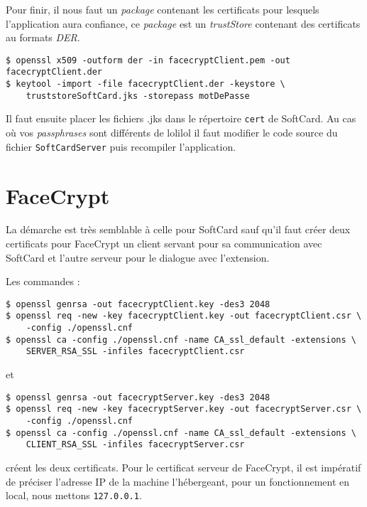 \documentclass[a4paper,10pt]{article}
\begin{document}
Pour finir, il nous faut un \emph{package} contenant les certificats pour 
lesquels l'application aura confiance, ce \emph{package} est un 
\emph{trustStore} contenant des certificats au formats \emph{DER}.
\begin{verbatim}
$ openssl x509 -outform der -in facecryptClient.pem -out facecryptClient.der
$ keytool -import -file facecryptClient.der -keystore \ 
    truststoreSoftCard.jks -storepass motDePasse
\end{verbatim}

Il faut ensuite placer les fichiers .jks dans le répertoire \texttt{cert}
de SoftCard. Au cas où vos \emph{passphrases} sont différents de 
\og lolilol \fg{} il faut modifier le code source du fichier 
\texttt{SoftCardServer} puis recompiler l'application.

\section{FaceCrypt}
La démarche est très semblable à celle pour SoftCard sauf qu'il faut 
créer deux certificats pour FaceCrypt un client servant pour sa communication
avec SoftCard et l'autre serveur pour le dialogue avec l'extension.

Les commandes : 
\begin{verbatim}
$ openssl genrsa -out facecryptClient.key -des3 2048
$ openssl req -new -key facecryptClient.key -out facecryptClient.csr \
    -config ./openssl.cnf
$ openssl ca -config ./openssl.cnf -name CA_ssl_default -extensions \
    SERVER_RSA_SSL -infiles facecryptClient.csr
\end{verbatim}
et 
\begin{verbatim}
$ openssl genrsa -out facecryptServer.key -des3 2048
$ openssl req -new -key facecryptServer.key -out facecryptServer.csr \
    -config ./openssl.cnf
$ openssl ca -config ./openssl.cnf -name CA_ssl_default -extensions \
    CLIENT_RSA_SSL -infiles facecryptServer.csr
\end{verbatim}
créent les deux certificats. Pour le certificat serveur de FaceCrypt, il
est impératif de préciser l'adresse IP de la machine l'hébergeant, pour 
un fonctionnement en local, nous mettons \texttt{127.0.0.1}.
\end{document}
